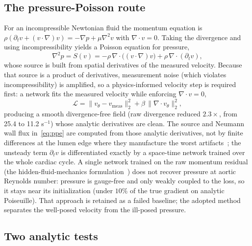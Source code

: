 \documentclass[journal]{IEEEtran}
\begin{document}
\subsection{The pressure-Poisson route}

For an incompressible Newtonian fluid the momentum equation is
$\rho(\partial_t v+(v\!\cdot\!\nabla)v)=-\nabla p+\mu\nabla^2 v$ with $\nabla\!\cdot v=0$.
Taking the divergence and using incompressibility yields a Poisson equation for pressure,
\begin{equation}
\nabla^2 p=S(v)=-\rho\,\nabla\!\cdot\big((v\!\cdot\!\nabla)v\big)+\rho\,\nabla\!\cdot(\partial_t v),
\label{eq:ppe}
\end{equation}
whose source is built from spatial derivatives of the measured velocity. Because that source is a
product of derivatives, measurement noise (which violates incompressibility) is amplified, so a
physics-informed velocity step is required first: a network fits the measured velocity while
enforcing $\nabla\!\cdot v=0$,
\begin{equation}
\mathcal L=\lVert v_\theta-v_\text{meas}\rVert_2^2+\beta\,\lVert\nabla\!\cdot v_\theta\rVert_2^2,
\end{equation}
producing a smooth divergence-free field (raw divergence reduced $2.3\times$, from 25.4 to
11.2 s$^{-1}$) whose analytic derivatives are clean. The source and Neumann wall flux
in~\eqref{eq:ppe} are computed from those analytic derivatives, not by finite differences at
the lumen edge where they manufacture the worst artifacts~\cite{kissas2020}; the unsteady term
$\partial_t v$ is differentiated exactly by a space-time network trained over the whole cardiac
cycle. A single network trained on the raw momentum residual (the hidden-fluid-mechanics
formulation~\cite{raissi2020}) does not recover pressure at aortic Reynolds number: pressure is
gauge-free and only weakly coupled to the loss, so it stays near its initialization (under
$10\%$ of the true gradient on analytic Poiseuille). That approach is retained as a failed
baseline; the adopted method separates the well-posed velocity from the ill-posed pressure.

\subsection{Two analytic tests}
\end{document}
